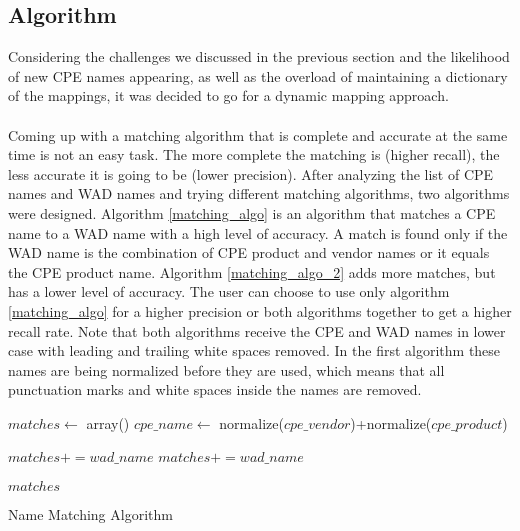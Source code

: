 \subsection{Algorithm}


Considering the challenges we discussed in the previous section and the likelihood of new CPE names appearing, as well as the overload of maintaining a dictionary of the mappings, it was decided to go for a dynamic mapping approach. 
\paragraph{}
Coming up with a matching algorithm that is complete and accurate at the same time is not an easy task. The more complete the matching is (higher recall), the less accurate it is going to be (lower precision). After analyzing the list of CPE names and WAD names and trying different matching algorithms, two algorithms were designed. Algorithm \ref{matching_algo} is an algorithm that matches a CPE name to a WAD name with a high level of accuracy. A match is found only if the WAD name is the combination of CPE product and vendor names or it equals the CPE product name. Algorithm \ref{matching_algo_2} adds more matches, but has a lower level of accuracy. The user can choose to use only algorithm \ref{matching_algo} for a higher precision or both algorithms together to get a higher recall rate. Note that both algorithms receive the CPE and WAD names in lower case with leading and trailing white spaces removed. In the first algorithm these names are being normalized before they are used, which means that all punctuation marks and white spaces inside the names are removed.  
\begin{algorithm}
\begin{algorithmic}
\STATE $matches\gets$ array()
\STATE $cpe\_name\gets$ normalize($cpe\_vendor$)+normalize($cpe\_product$)


		\STATE $matches+=wad\_name$
		\STATE $matches+=wad\_name$
		
		\ENDIF
\ENDFOR
\RETURN $matches$
%
%
%

\end{algorithmic}
\caption{Name Matching Algorithm}
\label{matching_algo}
\end{algorithm}

